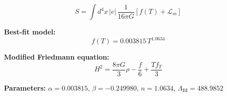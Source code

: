 
\begin{equation}
  S = \int d^4x \, |e| \, \frac{1}{16\pi G} \left[ f(T) + \mathcal{L}_m \right]
\end{equation}

\textbf{Best-fit model:}
\begin{equation}
  f(T) = 0.003815 \, T^{1.0634}
\end{equation}

\textbf{Modified Friedmann equation:}
\begin{equation}
  H^2 = \frac{8\pi G}{3} \rho - \frac{f}{6} + \frac{T f_T}{3}
\end{equation}

\textbf{Parameters:}
$\alpha = 0.003815$, \quad
$\beta = -0.249980$, \quad
$n = 1.0634$, \quad
$\Lambda_{\text{BI}} = 488.9852$